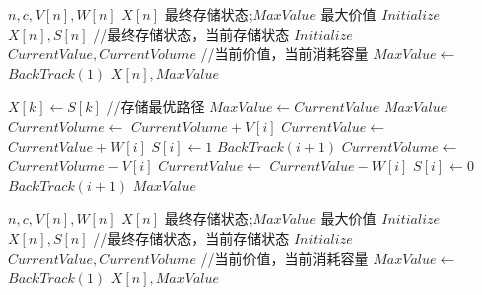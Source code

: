 \newpage 
\begin{breakablealgorithm}
	\caption{$0-1 \; Knapsack problem\; ——\; BackTracking \; Method $} 
	\begin{algorithmic}[1]
		\REQUIRE $n,c,V[n],W[n]$
		\ENSURE $X[n]$ 最终存储状态;$MaxValue$ 最大价值
		\STATE $Initialize$ $X[n],S[n]$ //最终存储状态，当前存储状态
		\STATE $Initialize$ $CurrentValue,CurrentVolume$ //当前价值，当前消耗容量
		\STATE $MaxValue \gets$ $BackTrack(1)$
		\RETURN $X[n],MaxValue$
	\end{algorithmic}
\end{breakablealgorithm}

\begin{breakablealgorithm}
	\caption{$BackTrack(i)$} 
	\begin{algorithmic}[1]
					\STATE $X[k] \gets S[k]$ //存储最优路径
				\ENDFOR
				\STATE $MaxValue \gets CurrentValue$
			\ENDIF
			\RETURN $MaxValue$
		\ENDIF
			\STATE $CurrentVolume \gets$ $CurrentVolume + V[i]$
			\STATE $CurrentValue \gets$ $CurrentValue + W[i]$
			\STATE $S[i]\gets 1$
			\STATE $BackTrack(i+1)$
			\STATE $CurrentVolume \gets$ $CurrentVolume - V[i]$
			\STATE $CurrentValue \gets$ $CurrentValue - W[i]$
		\ENDIF
		\STATE $S[i]\gets 0$
		\STATE $BackTrack(i+1)$
		\RETURN $MaxValue$
	\end{algorithmic}
\end{breakablealgorithm}


\newpage
\begin{breakablealgorithm}
	\caption{$0-1 \; Knapsack problem\; ——\; Branch \;and \;Bound $} 
	\begin{algorithmic}[1]
		\REQUIRE $n,c,V[n],W[n]$
		\ENSURE $X[n]$ 最终存储状态;$MaxValue$ 最大价值
		\STATE $Initialize$ $X[n],S[n]$ //最终存储状态，当前存储状态
		\STATE $Initialize$ $CurrentValue,CurrentVolume$ //当前价值，当前消耗容量
		\STATE $MaxValue \gets$ $BackTrack(1)$
		\RETURN $X[n],MaxValue$
	\end{algorithmic}
\end{breakablealgorithm}


